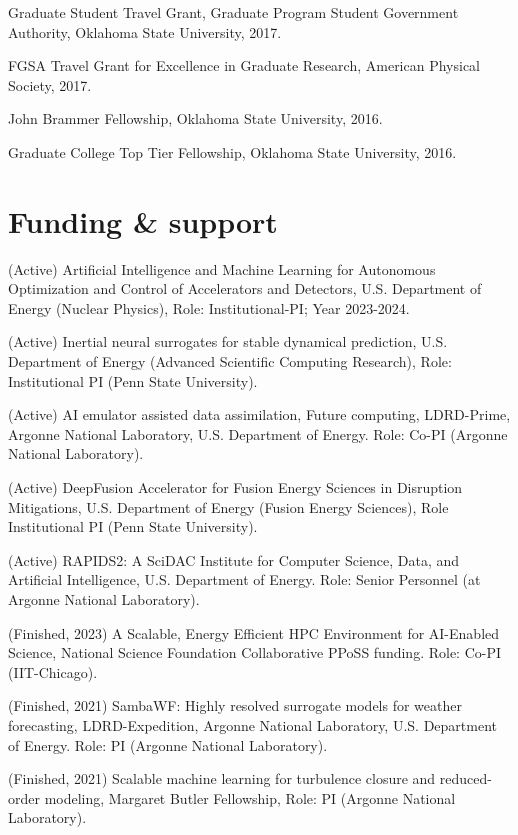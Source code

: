 \documentclass[letterpaper]{article}
\renewenvironment{itemize}{
  \begin{list}{}{
    \setlength{\leftmargin}{1.5em}
  }
}{
  \end{list}
}
\begin{document}
\begin{itemize}
\item Graduate Student Travel Grant, Graduate Program Student Government Authority, Oklahoma State University, 2017.

\item FGSA Travel Grant for Excellence in Graduate Research, American Physical Society, 2017.

\item John Brammer Fellowship, Oklahoma State University, 2016.

\item Graduate College Top Tier Fellowship, Oklahoma State University, 2016.

\end{itemize}

\section*{Funding \& support}

\begin{itemize}

  \item (Active) Artificial Intelligence and Machine Learning for Autonomous Optimization and Control of Accelerators and Detectors, U.S. Department of Energy (Nuclear Physics), Role: Institutional-PI; Year 2023-2024.

  \item (Active) Inertial neural surrogates for stable dynamical prediction, U.S. Department of Energy (Advanced Scientific Computing Research), Role: Institutional PI (Penn State University).

  \item (Active) AI emulator assisted data assimilation, Future computing, LDRD-Prime, Argonne National Laboratory, U.S. Department of Energy. Role: Co-PI (Argonne National Laboratory).

  \item (Active) DeepFusion Accelerator for Fusion Energy Sciences in Disruption Mitigations, U.S. Department of Energy (Fusion Energy Sciences), Role Institutional PI (Penn State University).

  \item (Active) RAPIDS2: A SciDAC Institute for Computer Science, Data, and Artificial Intelligence, U.S. Department of Energy. Role: Senior Personnel (at Argonne National Laboratory).

  \item (Finished, 2023) A Scalable, Energy Efficient HPC Environment for AI-Enabled Science, National Science Foundation Collaborative PPoSS funding. Role: Co-PI (IIT-Chicago).

  \item (Finished, 2021) SambaWF: Highly resolved surrogate models for weather forecasting, LDRD-Expedition, Argonne National Laboratory, U.S. Department of Energy. Role: PI (Argonne National Laboratory).

  \item (Finished, 2021) Scalable machine learning for turbulence closure and reduced-order modeling, Margaret Butler Fellowship, Role: PI (Argonne National Laboratory).


\end{itemize}
\end{document}
